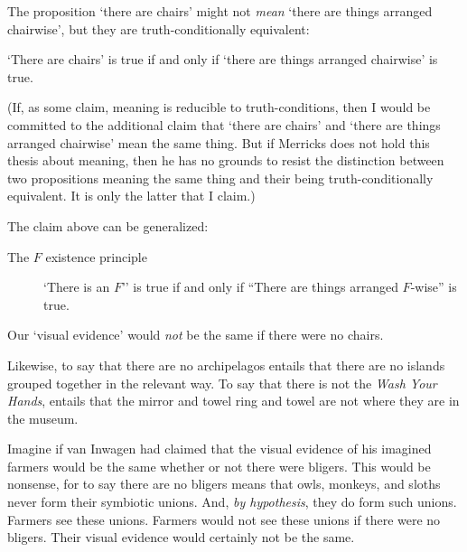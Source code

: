 \documentclass[11pt]{article}
\newenvironment{squote}{%
\begin{spacing}{1}
       	\begin{list}{}{%
\setlength{\labelwidth}{0pt}%
\rightmargin\leftmargin%
}
\item\relax
}{%
\end{list}%
\end{spacing}
}
\begin{document}
\begin{spacing}{1.25}
The proposition `there are chairs' might not {\em mean} `there are
things arranged chairwise', but they are truth-conditionally
equivalent:

\begin{squote}
`There are chairs' is true if and only if `there are things arranged
  chairwise' is true.
\end{squote}

(If, as some claim, meaning is reducible to truth-conditions, then I
would be committed to the additional claim that `there are chairs' and
`there are things arranged chairwise' mean the same thing.  But if
Merricks does not hold this thesis about meaning, then he has no
grounds to resist the distinction between two propositions meaning the
same thing and their being truth-conditionally equivalent.  It is only
the latter that I claim.)

The claim above can be generalized:

\begin{description}
  \item[The $F$ existence principle] `There is an $F$'' is true if
    and only if ``There are things arranged $F$-wise'' is
    true. \label{fwise}
\end{description}

Our `visual evidence' would {\em not} be the same if there were no
chairs.


Likewise, to say that there are no archipelagos entails that there are
no islands grouped together in the relevant way.  To say that there is
not the {\em Wash Your Hands}, entails that the mirror and towel ring
and towel are not where they are in the museum.

Imagine if van Inwagen had claimed that the visual evidence of his
imagined farmers would be the same whether or not there were bligers.
This would be nonsense, for to say there are no bligers means that
owls, monkeys, and sloths never form their symbiotic unions.  And,
{\em by hypothesis}, they do form such unions.  Farmers see these
unions.  Farmers would not see these unions if there were no bligers.
Their visual evidence would certainly not be the same.




\end{spacing}
\end{document}
